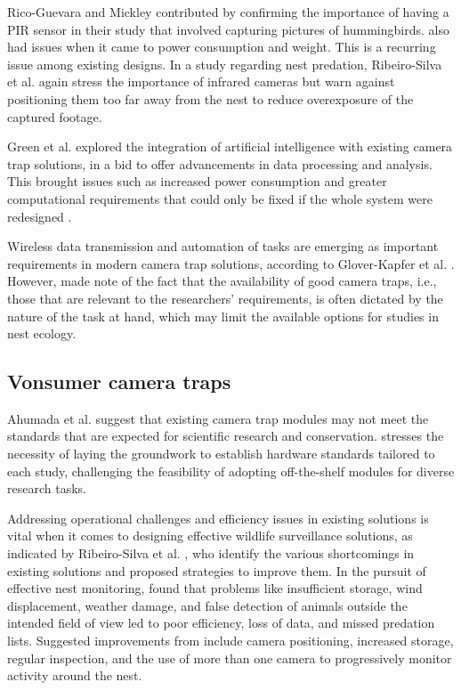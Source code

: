 Rico-Guevara and Mickley \cite{rico-guevara2017bring} contributed by confirming the importance of having a PIR sensor in their study that involved capturing pictures of hummingbirds. \cite{rico-guevara2017bring} also had issues when it came to power consumption and weight. This is a recurring issue among existing designs. In a study regarding nest predation, Ribeiro-Silva et al. \cite{ribeiro-silva2018testing} again stress the importance of infrared cameras but warn against positioning them too far away from the nest to reduce overexposure of the captured footage.

Green et al. \cite{green2020innovations} explored the integration of artificial intelligence with existing camera trap solutions, in a bid to offer advancements in data processing and analysis. This brought issues such as increased power consumption and greater computational requirements that could only be fixed if the whole system were redesigned \cite{green2020innovations}. 

Wireless data transmission and automation of tasks are emerging as important requirements in modern camera trap solutions, according to Glover-Kapfer et al. \cite{glover2019camera}. However, \cite{glover2019camera} made note of the fact that the availability of good camera traps, i.e., those that are relevant to the researchers’ requirements, is often dictated by the nature of the task at hand, which may limit the available options for studies in nest ecology.  

\subsection{Vonsumer camera traps}

Ahumada et al. \cite{ahumada2020wildlife} suggest that existing camera trap modules may not meet the standards that are expected for scientific research and conservation. \cite{ahumada2020wildlife} stresses the necessity of laying the groundwork to establish hardware standards tailored to each study, challenging the feasibility of adopting off-the-shelf modules for diverse research tasks. 

Addressing operational challenges and efficiency issues in existing solutions is vital when it comes to designing effective wildlife surveillance solutions, as indicated by Ribeiro-Silva  et al. \cite{ribeiro-silva2018testing}, who identify the various shortcomings in existing solutions and proposed strategies to improve them. In the pursuit of effective nest monitoring, \cite{ribeiro-silva2018testing} found that problems like insufficient storage, wind displacement, weather damage, and false detection of animals outside the intended field of view led to poor efficiency, loss of data, and missed predation lists. Suggested improvements from \cite{ribeiro-silva2018testing} include camera positioning, increased storage, regular inspection, and the use of more than one camera to progressively monitor activity around the nest. 


